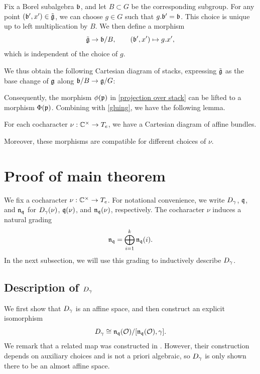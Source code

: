 \documentclass[11pt]{article}
\numberwithin{equation}{section}
\begin{document}
Fix a Borel subalgebra $\mathfrak{b}$, and let $B\subset G$ be the corresponding
subgroup. For any point $(\mathfrak{b}',x')\in \tilde{\mathfrak{g}}$, we can choose
$g\in G$ such that $g.\mathfrak{b}'=\mathfrak{b}$. This choice is unique up to left
multiplication by $B$. We then define a morphism
\[
\tilde{\mathfrak{g}}\to \mathfrak{b}/B,
\qquad
(\mathfrak{b}',x') \mapsto g.x',
\]
which is independent of the choice of $g$.

We thus obtain the following Cartesian diagram of stacks, expressing
$\tilde{\mathfrak{g}}$ as the base change of $\mathfrak{g}$ along $\mathfrak{b}/B \to \mathfrak{g}/G$:
\begin{center}
\end{center}

Consequently, the morphism $\phi(\mathfrak{p})$ in \cref{projection over stack} can be lifted to a morphism $\Phi(\mathfrak{p})$. Combining with \cref{gluing}, we have the following lemma.
\begin{lem}\label{isom diagram}
For each cocharacter $\nu: \mathbb{C}^\times \to T_e$, we have a Cartesian diagram of affine bundles.
    \begin{center}
    \end{center} 
    Moreover, these morphisms are compatible for different choices of $\nu$.
\end{lem}

\section{Proof of main theorem}
We fix a cocharacter $\nu:\mathbb{C}^\times \to T_e$. For notational convenience,
we write $D_\gamma$, $\mathfrak{q}$, and $\mathfrak{n}_{\mathfrak{q}}$ for $D_\gamma(\nu)$, $\mathfrak{q}(\nu)$,
and $\mathfrak{n}_{\mathfrak{q}}(\nu)$, respectively. The cocharacter $\nu$ induces a natural grading
\[
\mathfrak{n}_{\mathfrak{q}} = \bigoplus_{i=1}^{k} \mathfrak{n}_{\mathfrak{q}}(i).
\]
In the next subsection, we will use this grading to inductively describe $D_\gamma$.
\subsection{Description of $D_\gamma$}
We first show that $D_\gamma$ is an affine space, and then construct
an explicit isomorphism
\[
D_\gamma \cong \mathfrak{n}_{\mathfrak{q}}(\mathcal{O})/[\mathfrak{n}_{\mathfrak{q}}(\mathcal{O}),\gamma].
\]
We remark that a related map was constructed in \cite[Section 5]{KL88}.
However, their construction depends on auxiliary choices and is not
a priori algebraic, so $D_\gamma$ is only shown there to be an almost affine space.
\end{document}
